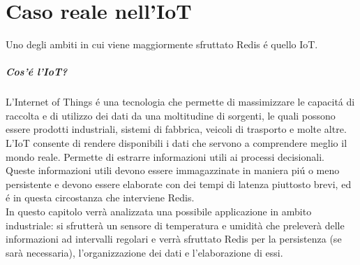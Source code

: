 \chapter{Caso reale nell'IoT}
Uno degli ambiti in cui viene maggiormente sfruttato Redis é quello IoT.
\paragraph{Cos'é l'IoT?\\}
L'Internet of Things é una tecnologia che permette di massimizzare le capacitá di raccolta e di utilizzo
dei dati da una moltitudine di sorgenti, le quali possono essere prodotti industriali, sistemi di fabbrica, veicoli
di trasporto e molte altre.\\
L'IoT consente di rendere disponibili i dati che servono a comprendere meglio il mondo reale.
Permette di estrarre informazioni utili ai processi decisionali.\\
Queste informazioni utili devono essere immagazzinate in maniera piú o meno persistente
e devono essere elaborate con dei tempi di latenza piuttosto brevi, ed é in questa circostanza che interviene Redis.
\\
In questo capitolo verrà analizzata una possibile applicazione in ambito industriale:
si sfrutterà un sensore di temperatura e umidità che preleverà delle informazioni ad intervalli regolari e
verrà sfruttato Redis per la persistenza (se sarà necessaria), l'organizzazione dei dati e l'elaborazione di essi.

